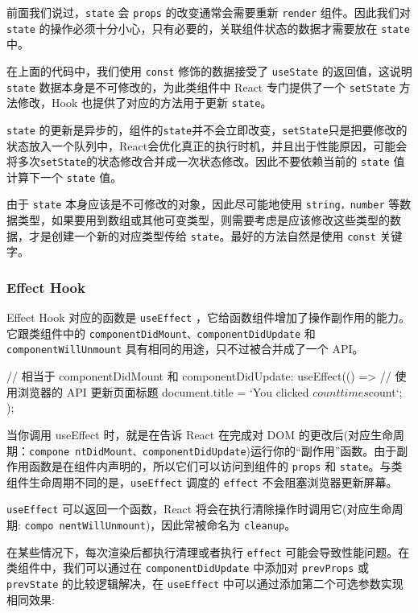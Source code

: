 前面我们说过，\texttt{state} 会 \texttt{props} 的改变通常会需要重新 \texttt{render} 组件。因此我们对 \texttt{state} 的操作必须十分小心，只有必要的，关联组件状态的数据才需要放在 \texttt{state} 中。

在上面的代码中，我们使用 \texttt{const} 修饰的数据接受了 \texttt{useState} 的返回值，这说明 \texttt{state} 数据本身是不可修改的，为此类组件中 React 专门提供了一个 \texttt{setState} 方法修改，Hook 也提供了对应的方法用于更新 \texttt{state}。

\texttt{state} 的更新是异步的，组件的\texttt{state}并不会立即改变，\texttt{setState}只是把要修改的状态放入一个队列中，React会优化真正的执行时机，并且出于性能原因，可能会将多次\texttt{setState}的状态修改合并成一次状态修改。因此不要依赖当前的 \texttt{state} 值计算下一个 \texttt{state} 值。

由于 \texttt{state} 本身应该是不可修改的对象，因此尽可能地使用 \texttt{string，number} 等数据类型，如果要用到数组或其他可变类型，则需要考虑是应该修改这些类型的数据，才是创建一个新的对应类型传给 \texttt{state}。最好的方法自然是使用 \texttt{const} 关键字。

\subsubsection{Effect Hook}

Effect Hook 对应的函数是 \texttt{useEffect} ，它给函数组件增加了操作副作用的能力。它跟类组件中的 \texttt{componentDidMount、componentDidUpdate} 和 \texttt{componentWillUnmount} 具有相同的用途，只不过被合并成了一个 API。

\begin{JavaScript}
// 相当于 componentDidMount 和 componentDidUpdate:
useEffect(() => {
  // 使用浏览器的 API 更新页面标题
  document.title = `You clicked ${count} times ${count}`;
});
\end{JavaScript}

当你调用 useEffect 时，就是在告诉 React 在完成对 DOM 的更改后(对应生命周期：\texttt{compone ntDidMount、componentDidUpdate})运行你的“副作用”函数。由于副作用函数是在组件内声明的，所以它们可以访问到组件的 \texttt{props} 和 \texttt{state}。与类组件生命周期不同的是，\texttt{useEffect} 调度的 \texttt{effect} 不会阻塞浏览器更新屏幕。

\texttt{useEffect} 可以返回一个函数，React 将会在执行清除操作时调用它(对应生命周期: \texttt{compo nentWillUnmount})，因此常被命名为 \texttt{cleanup}。

在某些情况下，每次渲染后都执行清理或者执行 \texttt{effect} 可能会导致性能问题。在类组件中，我们可以通过在 \texttt{componentDidUpdate} 中添加对 \texttt{prevProps} 或 \texttt{prevState} 的比较逻辑解决，在 \texttt{useEffect} 中可以通过添加第二个可选参数实现相同效果:


